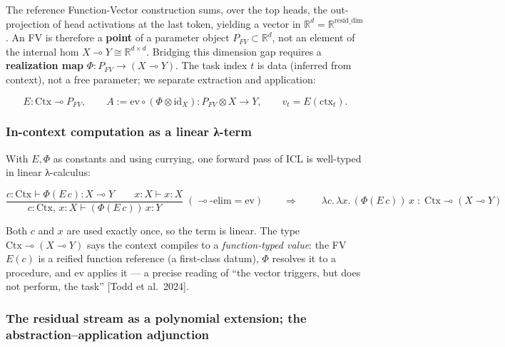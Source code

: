 \documentclass[a4paper,11pt]{article}
\begin{document}
The reference Function-Vector construction sums, over the top heads, the
out-projection of head activations at the last token, yielding a vector
in \(\mathbb{R}^d=\mathbb{R}^{\mathrm{resid\_dim}}\). An FV is therefore
a \textbf{point} of a parameter object \(P_{FV}\subset\mathbb{R}^d\),
not an element of the internal hom
\(X\multimap Y\cong\mathbb{R}^{d\times d}\). Bridging this dimension gap
requires a \textbf{realization map} \(\Phi:P_{FV}\to(X\multimap Y)\).
The task index \(t\) is data (inferred from context), not a free
parameter; we separate extraction and application:

\[E:\mathrm{Ctx}\multimap P_{FV},\qquad A:=\mathrm{ev}\circ(\Phi\otimes\mathrm{id}_X):P_{FV}\otimes X\to Y,\qquad v_t=E(\mathrm{ctx}_t).\]

\hypertarget{in-context-computation-as-a-linear-ux3bb-term}{%
\subsubsection{In-context computation as a linear
λ-term}\label{in-context-computation-as-a-linear-ux3bb-term}}

With \(E,\Phi\) as constants and using currying, one forward pass of ICL
is well-typed in linear λ-calculus:

\[
\dfrac{c:\mathrm{Ctx}\vdash \Phi(E\,c):X\multimap Y \qquad x:X\vdash x:X}
{c:\mathrm{Ctx},\,x:X\vdash (\Phi(E\,c))\,x:Y}\;(\multimap\text{-elim}=\mathrm{ev})
\qquad\Longrightarrow\qquad
\boxed{\;\lambda c.\,\lambda x.\,(\Phi(E\,c))\,x\;:\;\mathrm{Ctx}\multimap(X\multimap Y)\;}
\]

Both \(c\) and \(x\) are used exactly once, so the term is linear. The
type \(\mathrm{Ctx}\multimap(X\multimap Y)\) says the context compiles
to a \emph{function-typed value}: the FV \(E(c)\) is a reified function
reference (a first-class datum), \(\Phi\) resolves it to a procedure,
and \(\mathrm{ev}\) applies it --- a precise reading of ``the vector
triggers, but does not perform, the task'' {[}Todd et al.~2024{]}.

\hypertarget{the-residual-stream-as-a-polynomial-extension-the-abstractionapplication-adjunction}{%
\subsubsection{The residual stream as a polynomial extension; the
abstraction--application
adjunction}\label{the-residual-stream-as-a-polynomial-extension-the-abstractionapplication-adjunction}}
\end{document}
